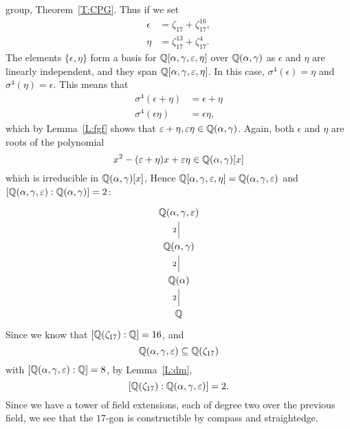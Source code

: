 \documentclass{ximera}
\begin{document}
\begin{example}
  group, Theorem~\ref{T:CPG}. Thus if we set
  \begin{align*}
    \epsilon &= \zeta_{17} + \zeta_{17}^{16},\\
    \eta &= \zeta_{17}^{13} + \zeta_{17}^4.
  \end{align*}
  The elements $\{\epsilon,\eta\}$ form a basis for
  $\mathbb Q[\alpha,\gamma,\varepsilon,\eta]$ over $\mathbb Q(\alpha,\gamma)$ as
  $\epsilon$ and $\eta$ are linearly independent, and they span
  $\mathbb Q[\alpha,\gamma,\varepsilon,\eta]$.  In this case,
  $\sigma^4(\epsilon) = \eta$ and $\sigma^4(\eta) = \epsilon$. This
  means that
  \begin{align*}
    \sigma^4(\epsilon+\eta) &= \epsilon + \eta\\
    \sigma^4(\epsilon\eta) &= \epsilon\eta,
  \end{align*}
  which by Lemma~\ref{L:fgf} shows that
  $\varepsilon+\eta,\varepsilon\eta\in\mathbb Q(\alpha,\gamma)$. Again, both
  $\epsilon$ and $\eta$ are roots of the polynomial
  \[
  x^2 - (\varepsilon +\eta) x + \varepsilon\eta\in\mathbb Q(\alpha,\gamma)[x]
  \]
  which is irreducible in $\mathbb Q(\alpha,\gamma)[x]$, Hence
  $\mathbb Q[\alpha,\gamma,\varepsilon,\eta]= \mathbb Q(\alpha,\gamma,\varepsilon)$ and
  $[\mathbb Q(\alpha,\gamma,\varepsilon):\mathbb Q(\alpha,\gamma)] = 2$:
  \[
  \begin{tikzcd}
    \Q(\alpha,\gamma,\epsilon)\\
    \Q(\alpha,\gamma)\ar[u,-,"2"]\\
    \Q(\alpha) \ar[u,-,"2"]\\
    \Q \ar[u,-,"2"]
  \end{tikzcd}
  \]
  Since we know that $[\mathbb Q(\zeta_{17}):\mathbb Q] = 16$, and
  \[
  \mathbb Q(\alpha,\gamma,\varepsilon)\subseteq \mathbb Q(\zeta_{17})
  \]
  with $[\mathbb Q(\alpha,\gamma,\varepsilon):\mathbb Q]=8$, by Lemma~\ref{L:dm},
  \[
    [\mathbb Q(\zeta_{17}):\mathbb Q(\alpha,\gamma,\varepsilon)]=2.
  \]
  Since we have a tower of field extensions, each of degree two over
  the previous field, we see that the $17$-gon is constructible by
  compass and straightedge.
\end{example}
\end{document}
